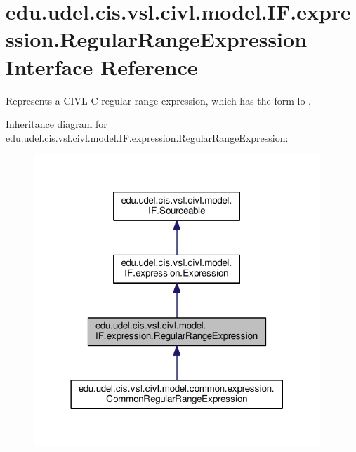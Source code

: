\hypertarget{interfaceedu_1_1udel_1_1cis_1_1vsl_1_1civl_1_1model_1_1IF_1_1expression_1_1RegularRangeExpression}{}\section{edu.\+udel.\+cis.\+vsl.\+civl.\+model.\+I\+F.\+expression.\+Regular\+Range\+Expression Interface Reference}
\label{interfaceedu_1_1udel_1_1cis_1_1vsl_1_1civl_1_1model_1_1IF_1_1expression_1_1RegularRangeExpression}


Represents a C\+I\+V\+L-\/\+C regular range expression, which has the form {\ttfamily lo . } 




Inheritance diagram for edu.\+udel.\+cis.\+vsl.\+civl.\+model.\+I\+F.\+expression.\+Regular\+Range\+Expression\+:
\nopagebreak
\begin{figure}[H]
\begin{center}
\leavevmode
\includegraphics[width=306pt]{interfaceedu_1_1udel_1_1cis_1_1vsl_1_1civl_1_1model_1_1IF_1_1expression_1_1RegularRangeExpression__inherit__graph}
\end{center}
\end{figure}


